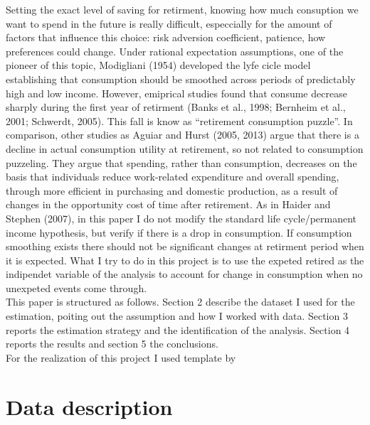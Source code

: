 \documentclass[11pt, a4paper, leqno]{article}
\begin{document}
Setting the exact level of saving for retirment, knowing how much consuption we want to spend in the future is really difficult, especcially for the amount of factors that influence this choice: risk adversion coefficient, patience, how preferences could change. Under rational expectation assumptions, one of the pioneer of this topic, Modigliani (1954) developed the lyfe cicle model establishing that consumption should be smoothed across periods of predictably high and low income. However, emiprical studies found that consume decrease sharply during the first year of retirment (Banks et al., 1998; Bernheim et al., 2001; Schwerdt, 2005). This fall is know as “retirement consumption puzzle”. In comparison, other studies as Aguiar and Hurst (2005, 2013) argue that there is a decline in actual consumption utility at retirement, so not related to consumption puzzeling. They argue that spending, rather than consumption, decreases on the basis that individuals reduce work-related expenditure and overall spending, through more efficient in purchasing and domestic production, as a result of changes in the opportunity cost of time after retirement.
As in Haider and Stephen (2007), in this paper I do not modify the standard life cycle/permanent income hypothesis, but verify if there is a drop in consumption. If consumption smoothing exists there should not be significant changes at retirment period when it is expected. What I try to do in this project is to use the expeted retired as the indipendet variable of the analysis to account for change in consumption when no unexpeted events come through.
\\\hspace*{4mm} This paper is structured as follows. Section 2 describe the dataset I used for the estimation, poiting out the assumption and how I worked with data. Section 3 reports the estimation strategy and the identification of the analysis. Section 4 reports the results and section 5 the conclusions.
\\\hspace*{4mm}   For the realization of this project I used template by

\section{Data description}
\label{sec:data-description}
\end{document}
